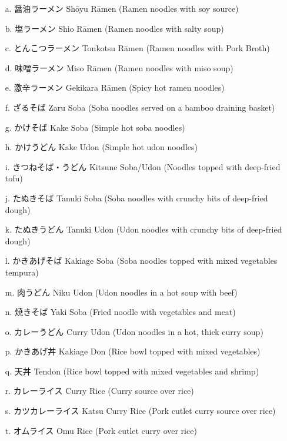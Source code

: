 \documentclass[uplatex,dvipdfmx,b5paper,english,10pt]{jsbook}
\begin{document}
\begin{toianswer}
\begin{itemize}\small
 \item[{\ttfamily a.}] 醤油ラーメン Sh\=oyu R\=amen (Ramen noodles with soy source)
 \item[{\ttfamily b.}] 塩ラーメン Shio R\=amen (Ramen noodles with salty soup)
 \item[{\ttfamily c.}] とんこつラーメン Tonkotsu R\=amen (Ramen noodles with Pork Broth)
 \item[{\ttfamily d.}] 味噌ラーメン Miso R\=amen (Ramen noodles with miso soup)
 \item[{\ttfamily e.}] 激辛ラーメン Gekikara R\=amen (Spicy hot ramen noodles)
 \item[{\ttfamily f.}] ざるそば Zaru Soba (Soba noodles served on a bamboo draining basket)
 \item[{\ttfamily g.}] かけそば Kake Soba (Simple hot soba noodles)
 \item[{\ttfamily h.}] かけうどん Kake Udon (Simple hot udon noodles)
 \item[{\ttfamily i.}] きつねそば・うどん Kitsune Soba/Udon (Noodles topped with deep-fried tofu)
 \item[{\ttfamily j.}] たぬきそば Tanuki Soba (Soba noodles with crunchy bits of deep-fried dough)
 \item[{\ttfamily k.}] たぬきうどん Tanuki Udon (Udon noodles with crunchy bits of deep-fried dough)
 \item[{\ttfamily l.}] かきあげそば Kakiage Soba (Soba noodles topped with mixed vegetables tempura)
 \item[{\ttfamily m.}] 肉うどん Niku Udon (Udon noodles in a hot soup with beef)
 \item[{\ttfamily n.}] 焼きそば Yaki Soba (Fried noodle with vegetables and meat)
 \item[{\ttfamily o.}] カレーうどん Curry Udon (Udon noodles in a hot, thick curry soup)
 \item[{\ttfamily p.}] かきあげ丼 Kakiage Don (Rice bowl topped with mixed vegetables)
 \item[{\ttfamily q.}] 天丼 Tendon (Rice bowl topped with mixed vegetables and shrimp)
 \item[{\ttfamily r.}] カレーライス Curry Rice (Curry source over rice)
 \item[{\ttfamily s.}] カツカレーライス Katsu Curry Rice (Pork cutlet curry source over rice)
 \item[{\ttfamily t.}] オムライス Omu Rice (Pork cutlet curry over rice)

\end{itemize}
\end{toianswer}
\end{document}
